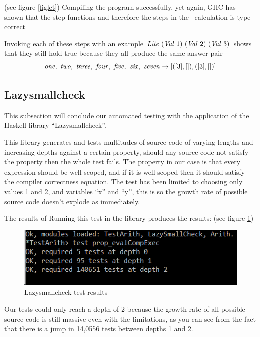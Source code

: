 \documentclass {article}
\begin{document}
(see figure \ref{figlet})
Compiling the program successfully, yet again,
GHC has shown that the step functions
and therefore the 
steps in the \leet\ calculation is type correct

Invoking each of these steps
with an example 
\( \mathit{Lite\ } (\mathit{Val\ } 1)\ (\mathit{Val\ } 2)\ (\mathit{Val\ } 3) \)
shows that they still hold true
because they all produce the same answer pair
\begin{equation*}
\mathit{one,\ two,\ three,\ four,\ five,\ six,\ seven } 
		\rightarrow [([3], []),([3], [])] \\
\end{equation*}

\subsection{Lazysmallcheck}

This subsection will conclude our automated testing
with the application of the Haskell library
``Lazysmallcheck''.

This library generates and tests multitudes of source 
code of varying lengths and increasing depths
against a certain property, should any source 
code not satisfy the property then the whole test fails.
The property in our case is that 
every expression should be well scoped,
and if it is well scoped then
it should satisfy the compiler correctness equation.
The test has been limited to choosing only values
1 and 2, and variables ``x'' and ``y'',
this is so the growth rate of possible source code
doesn't explode as immediately.

The results of Running this test in the library
produces the results:
(see figure \ref{lsch})
\begin{figure}[h]
\includegraphics[scale=0.8]{ghctest}
\caption{Lazysmallcheck test results}
\label{lsch}
\end{figure}


Our tests could only reach a depth of 2 because
the growth rate of all possible source code
is still massive even with the limitations,
as you can see from the fact that there is a
jump in 14,0556 tests between depths 1 and 2.
\end{document}
